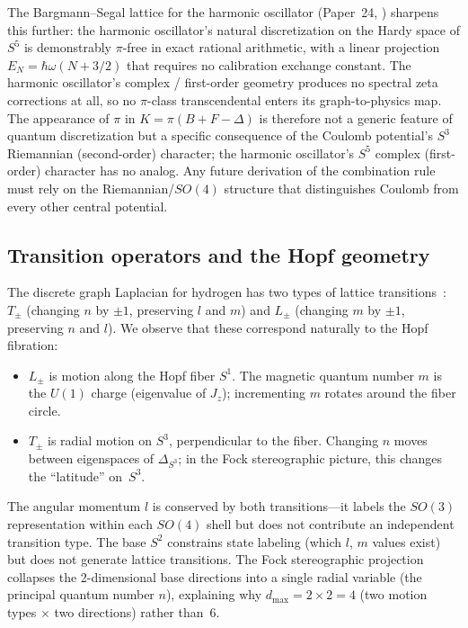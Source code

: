 \documentclass[aps,prl,twocolumn,superscriptaddress]{revtex4-2}
\begin{document}
The Bargmann--Segal lattice for the harmonic oscillator (Paper~24,
\cite{paper24_bargmann}) sharpens this further: the harmonic
oscillator's natural discretization on the Hardy space of $S^5$ is
demonstrably $\pi$-free in exact rational arithmetic, with a linear
projection $E_N = \hbar\omega(N + 3/2)$ that requires no calibration
exchange constant. The harmonic oscillator's complex / first-order
geometry produces no spectral zeta corrections at all, so no
$\pi$-class transcendental enters its graph-to-physics map. The
appearance of $\pi$ in $K = \pi(B + F - \Delta)$ is therefore not a
generic feature of quantum discretization but a specific consequence
of the Coulomb potential's $S^3$ Riemannian (second-order) character;
the harmonic oscillator's $S^5$ complex (first-order) character has
no analog. Any future derivation of the combination rule must rely on
the Riemannian/$SO(4)$ structure that distinguishes Coulomb from
every other central potential.


\subsection{Transition operators and the Hopf geometry}

The discrete graph Laplacian for hydrogen has two types of lattice
transitions~\cite{phase2_kappa}: $T_\pm$ (changing $n$ by $\pm 1$,
preserving $l$ and $m$) and $L_\pm$ (changing $m$ by $\pm 1$, preserving
$n$ and $l$). We observe that these correspond naturally to the Hopf
fibration:
\begin{itemize}
\item $L_\pm$ is motion along the Hopf fiber $S^1$. The magnetic quantum
  number $m$ is the $U(1)$ charge (eigenvalue of $J_z$); incrementing
  $m$ rotates around the fiber circle.
\item $T_\pm$ is radial motion on $S^3$, perpendicular to the fiber.
  Changing $n$ moves between eigenspaces of $\Delta_{S^3}$; in the Fock
  stereographic picture, this changes the ``latitude'' on~$S^3$.
\end{itemize}
The angular momentum $l$ is conserved by both transitions---it labels
the $SO(3)$ representation within each $SO(4)$ shell but does not
contribute an independent transition type. The base $S^2$ constrains
state labeling (which $l$, $m$ values exist) but does not generate
lattice transitions. The Fock stereographic projection collapses the
2-dimensional base directions into a single radial variable (the
principal quantum number $n$), explaining why $d_{\max} = 2 \times 2 = 4$
(two motion types $\times$ two directions) rather than~6.
\end{document}
